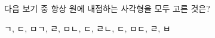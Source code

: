 다음 보기 중 항상 원에 내접하는 사각형을 모두 고른 것은?
\begin{choices32}{ㄱ, ㄷ, ㅁ}{ㄱ, ㄹ, ㅁ}{ㄴ, ㄷ, ㄹ}{ㄴ, ㄷ, ㅁ}{ㄷ, ㄹ, ㅂ}\end{choices32}
